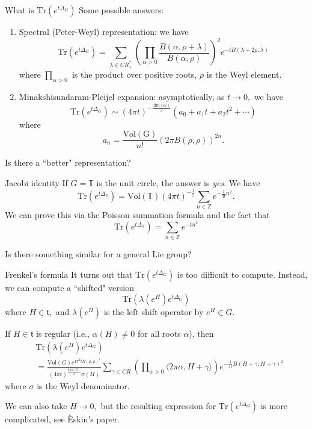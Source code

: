 \documentclass{beamer}
\numberwithin{equation}{section}
\theoremstyle{plain}
\theoremstyle{plain}
\theoremstyle{definition}
\theoremstyle{plain}
\theoremstyle{plain}
\theoremstyle{definition}
\newcommand{\Itgr}{\mathbb{Z}}
\newcommand{\Circ}{\mathbb{T}}
\newcommand{\Tr}{\mathrm{Tr}}
\newcommand{\tf}{\mathfrak{t}}
\begin{document}
\begin{frame}{What is $\Tr(e^{t\Delta_G})$}
  Some possible answers:
  \begin{enumerate}
    \item{} Spectral (Peter-Weyl) representation: we have
    \[
        \Tr(e^{t\Delta_G}) = \sum_{\lambda\in CR^*_+} \left(\prod_{\alpha>0} \frac{B(\alpha,\rho+\lambda)}{B(\alpha,\rho)}\right)^2e^{-tB(\lambda+2\rho,\lambda)}
    \]
    where $\prod_{\alpha>0}$ is the product over positive roots, $\rho$ is the Weyl element.
    \item{} Minakshisundaram-Pleijel expansion: asymptotically, as $t\to 0,$ we have
    \[
        \Tr(e^{t\Delta_G}) \sim (4\pi t)^{-\frac{\mathrm{dim}(G)}{2}}(a_0+a_1t+a_2t^2+\cdots)
    \]
    where 
    \[
      a_n = \frac{\mathrm{Vol(G)}}{n!}(2\pi B(\rho,\rho))^{2n}.
    \]
  \end{enumerate}
  \pause
  Is there a ``better" representation?
\end{frame}

\begin{frame}{Jacobi identity}
  If $G = \Circ$ is the unit circle, the answer is \emph{yes}. We have
  \[
    \Tr(e^{t\Delta_{\Circ}}) = \mathrm{Vol}(\Circ)(4\pi t)^{-\frac12}\sum_{n\in \Itgr} e^{-\frac{1}{4t}n^2}.
  \]
  We can prove this via the Poisson summation formula and the fact that
  \[
    \Tr(e^{t\Delta_{\Circ}}) = \sum_{n\in \Itgr} e^{-tn^2}
  \]
  
  Is there something similar for a general Lie group?
\end{frame}

\begin{frame}{Frenkel's formula}
  It turns out that $\Tr(e^{t\Delta_G})$ is too difficult to compute. Instead, we can compute a ``shifted" version
  \[
    \Tr(\lambda(e^H)e^{t\Delta_G})
  \]
  where $H\in \tf,$ and $\lambda(e^H)$ is the left shift operator by $e^H\in G.$
  \begin{theorem}
      If $H\in \tf$ is regular (i.e., $\alpha(H)\neq 0$ for all roots $\alpha$), then
      \begin{align*}
          &\Tr(\lambda(e^H)e^{t\Delta_G})\\
          &= \frac{\mathrm{Vol}(G)e^{4\pi^2tB(\rho,\rho)^2}}{(4\pi t)^{\frac{\mathrm{dim}(G)}{2}}\sigma(H)}\sum_{\gamma \in CR} \left(\prod_{\alpha>0} \langle 2\pi \alpha,H+\gamma\rangle\right) e^{-\frac{1}{4t}B(H+\gamma,H+\gamma)^2} 
      \end{align*}
      where $\sigma$ is the Weyl denominator.
  \end{theorem}
  \pause
  We can also take $H\to 0,$ but the resulting expression for $\Tr(e^{t\Delta_G})$ is more complicated, see \`{E}skin's paper.
\end{frame}
\end{document}
